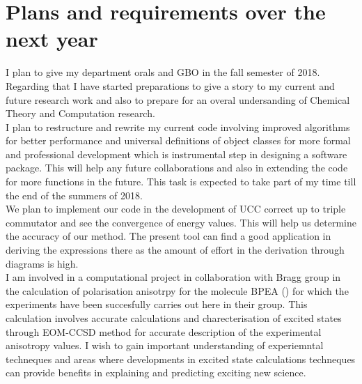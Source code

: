 \documentclass[11pt, oneside]{article}   	%
\begin{document}
\section{Plans and requirements over the next year}
I plan to give my department orals and GBO in the fall semester of 2018. Regarding that I have started preparations to give a story to my current and future research work and also to prepare for an overal undersanding of Chemical Theory and Computation research. \\

I plan to restructure and rewrite my current code involving improved algorithms for better performance and universal definitions of object classes for more formal and professional development which is instrumental step in designing a software package. This will help any future collaborations and also in extending the code for more functions in the future. This task is expected to take part of my time till the end of the summers of 2018. \\

We plan to implement our code in the development of UCC correct up to triple commutator and see the convergence of energy values. This will help us determine the accuracy of our method. The present tool can find a good application in deriving the expressions there as the amount of effort in the derivation through diagrams is high.\\

I am involved in a computational project in collaboration with Bragg group in the calculation of polarisation anisotrpy for the molecule BPEA () for which the experiments have been succesfully carries out here in their group. This calculation involves accurate calculations and charecterisation of excited states through EOM-CCSD method for accurate description of the experimental anisotropy values. I wish to gain important understanding of experiemntal techneques and areas where developments in excited state calculations techneques can provide benefits in explaining and predicting exciting new science.\\
\section{}
\end{document}

